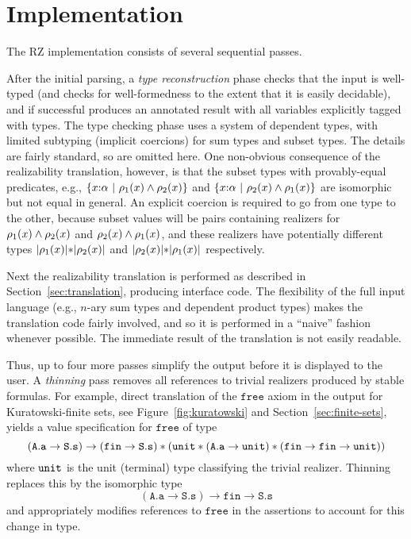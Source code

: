 \section{Implementation}
\label{sec:implementation}

The RZ implementation consists of several sequential passes.

After the initial parsing, a \emph{type reconstruction} phase checks
that the input is well-typed (and checks for well-formedness to the
extent that it is easily decidable), and if successful produces an
annotated result with all variables explicitly tagged with types. The
type checking phase uses a system of dependent types, with limited
subtyping (implicit coercions) for sum types and subset types. 
\iflong
The
details are fairly standard, so are omitted here. One non-obvious
consequence of the realizability translation, however, is that the
subset types with provably-equal predicates, e.g.,
$\{x{:}\alpha\ |\ \rho_1(x)\land \rho_2(x)\}$ and
$\{x{:}\alpha\ |\ \rho_2(x)\land \rho_1(x)\}$ are isomorphic
but not equal in general. An
explicit coercion is required to go from one type to the other,
because subset values will be pairs containing realizers for
$\rho_1(x)\land \rho_2(x)$ and
$\rho_2(x)\land \rho_1(x)$, and these realizers have
potentially different types $|\rho_1(x)|\mathtt{*}|\rho_2(x)|$ and
$|\rho_2(x)|\mathtt{*}|\rho_1(x)|$ respectively.
\fi %

Next the realizability translation is performed as described in
Section~\ref{sec:translation}, producing interface code. The
flexibility of the full input language (e.g., $n$-ary sum types and
dependent product types) makes the translation code fairly involved,
and so it is performed in a ``naive'' fashion whenever possible. The
immediate result of the translation is not easily readable.
 
Thus, up to four more passes simplify the output before it is displayed to
the user. A \emph{thinning} pass removes all references to trivial
realizers produced by stable formulas.
\iflong
For example, direct translation
of the $\mathtt{free}$ axiom in the output for Kuratowski-finite sets,
see Figure~\ref{fig:kuratowski} and Section~\ref{sec:finite-sets},
yields a value specification for $\mathtt{free}$ of type
%
\begin{equation*}
  (\mathtt{A.a} \to \mathtt{S.s}) \to 
  (\mathtt{fin} \to \mathtt{S.s}) * (\mathtt{unit} * (\mathtt{A.a} \to
  \mathtt{unit}) *
  (\mathtt{fin} \to \mathtt{fin} \to \mathtt{unit}))
\end{equation*}
%
where $\mathtt{unit}$ is the unit (terminal) type classifying the trivial
realizer. Thinning replaces this by the isomorphic type
%
\begin{equation*}
  (\mathtt{A.a} \to \mathtt{S.s}) \to \mathtt{fin} \to \mathtt{S.s}
\end{equation*}
%
and appropriately modifies references to $\mathtt{free}$ in the assertions to account for this change in type.

